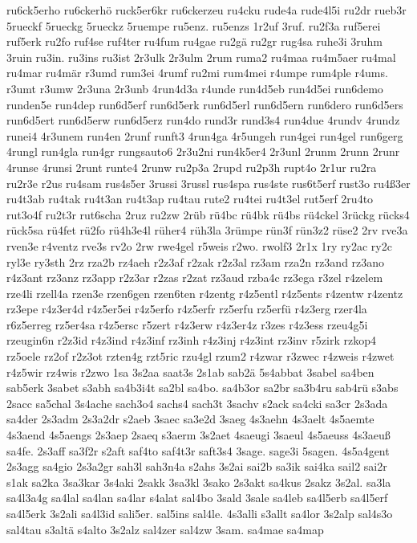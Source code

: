 {ru6ck5erho
ru6ckerhö
ruck5er6kr
ru6ckerzeu
ru4cku
rude4a
rude4l5i
ru2dr
rueb3r
5rueckf
5rueckg
5rueckz
5ruempe
ru5enz.
ru5enzs
1r2uf
3ruf.
ru2f3a
ruf5erei
ruf5erk
ru2fo
ruf4se
ruf4ter
ru4fum
ru4gae
ru2gä
ru2gr
rug4sa
ruhe3i
3ruhm
3ruin
ru3in.
ru3ins
ru3ist
2r3ulk
2r3ulm
2rum
ruma2
ru4maa
ru4m5aer
ru4mal
ru4mar
ru4mär
r3umd
rum3ei
4rumf
ru2mi
rum4mei
r4umpe
rum4ple
r4ums.
r3umt
r3umw
2r3una
2r3unb
4run4d3a
r4unde
run4d5eb
run4d5ei
run6demo
runden5e
run4dep
run6d5erf
run6d5erk
run6d5erl
run6d5ern
run6dero
run6d5ers
run6d5ert
run6d5erw
run6d5erz
run4do
rund3r
rund3s4
run4due
4rundv
4rundz
runei4
4r3unem
run4en
2runf
runft3
4run4ga
4r5ungeh
run4gei
run4gel
run6gerg
4rungl
run4gla
run4gr
rungsauto6
2r3u2ni
run4k5er4
2r3unl
2runm
2runn
2runr
4runse
4runsi
2runt
runte4
2runw
ru2p3a
2rupd
ru2p3h
rupt4o
2r1ur
ru2ra
ru2r3e
r2us
ru4sam
rus4s5er
3russi
3russl
rus4spa
rus4ste
rus6t5erf
rust3o
ru4ß3er
ru4t3ab
ru4tak
ru4t3an
ru4t3ap
ru4tau
rute2
ru4tei
ru4t3el
rut5erf
2ru4to
rut3o4f
ru2t3r
rut6scha
2ruz
ru2zw
2rüb
rü4bc
rü4bk
rü4bs
rü4ckel
3rückg
rücks4
rück5sa
rü4fet
rü2fo
rü4h3e4l
rüher4
rüh3la
3rümpe
rün3f
rün3z2
rüse2
2rv
rve3a
rven3e
r4ventz
rve3s
rv2o
2rw
rwe4gel
r5weis
r2wo.
rwolf3
2r1x
1ry
ry2ac
ry2c
ryl3e
ry3sth
2rz
rza2b
rz4aeh
r2z3af
r2zak
r2z3al
rz3am
rza2n
rz3and
rz3ano
r4z3ant
rz3anz
rz3app
r2z3ar
r2zas
r2zat
rz3aud
rzba4c
rz3ega
r3zel
r4zelem
rze4li
rzell4a
rzen3e
rzen6gen
rzen6ten
r4zentg
r4z5entl
r4z5ents
r4zentw
r4zentz
rz3epe
r4z3er4d
r4z5er5ei
r4z5erfo
r4z5erfr
rz5erfu
rz5erfü
r4z3erg
rzer4la
r6z5erreg
rz5er4sa
r4z5ersc
r5zert
r4z3erw
r4z3er4z
r3zes
r4z3ess
rzeu4g5i
rzeugin6n
r2z3id
r4z3ind
r4z3inf
rz3inh
r4z3inj
r4z3int
rz3inv
r5zirk
rzkop4
rz5oele
rz2of
r2z3ot
rzten4g
rzt5ric
rzu4gl
rzum2
r4zwar
r3zwec
r4zweis
r4zwet
r4z5wir
rz4wis
r2zwo
1sa
3s2aa
saat3s
2s1ab
sab2ä
5s4abbat
3sabel
sa4ben
sab5erk
3sabet
s3abh
sa4b3i4t
sa2bl
sa4bo.
sa4b3or
sa2br
sa3b4ru
sab4rü
s3abs
2sacc
sa5chal
3s4ache
sach3o4
sachs4
sach3t
3sachv
s2ack
sa4cki
sa3cr
2s3ada
sa4der
2s3adm
2s3a2dr
s2aeb
3saec
sa3e2d
3saeg
4s3aehn
4s3aelt
4s5aemte
4s3aend
4s5aengs
2s3aep
2saeq
s3aerm
3s2aet
4saeugi
3saeul
4s5aeuss
4s3aeuß
sa4fe.
2s3aff
sa3f2r
s2aft
saf4to
saf4t3r
saft3s4
3sage.
sage3i
5sagen.
4s5a4gent
2s3agg
sa4gio
2s3a2gr
sah3l
sah3n4a
s2ahs
3s2ai
sai2b
sa3ik
sai4ka
sail2
sai2r
s1ak
sa2ka
3sa3kar
3s4aki
2sakk
3sa3kl
3sako
2s3akt
sa4kus
2sakz
3s2al.
sa3la
sa4l3a4g
sa4lal
sa4lan
sa4lar
s4alat
sal4bo
3sald
3sale
sa4leb
sa4l5erb
sa4l5erf
sa4l5erk
3s2ali
sa4l3id
sali5er.
sal5ins
sal4le.
4s3alli
s3allt
sa4lor
3s2alp
sal4s3o
sal4tau
s3altä
s4alto
3s2alz
sal4zer
sal4zw
3sam.
sa4mae
sa4map
}
